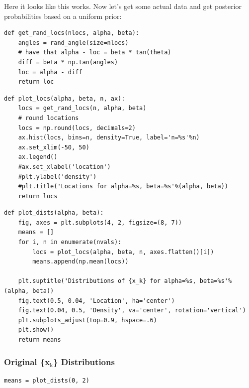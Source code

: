 \documentclass[11pt]{article}
\begin{document}
Here it looks like this works. Now let's get some actual data and get posterior
probabilities based on a uniform prior:

\begin{verbatim}
def get_rand_locs(nlocs, alpha, beta):
    angles = rand_angle(size=nlocs)
    # have that alpha - loc = beta * tan(theta)
    diff = beta * np.tan(angles)
    loc = alpha - diff
    return loc
\end{verbatim}


\begin{verbatim}
def plot_locs(alpha, beta, n, ax):
    locs = get_rand_locs(n, alpha, beta)
    # round locations
    locs = np.round(locs, decimals=2)
    ax.hist(locs, bins=n, density=True, label='n=%s'%n)
    ax.set_xlim(-50, 50)
    ax.legend()
    #ax.set_xlabel('location')
    #plt.ylabel('density')
    #plt.title('Locations for alpha=%s, beta=%s'%(alpha, beta))
    return locs
\end{verbatim}


\begin{verbatim}
def plot_dists(alpha, beta):
    fig, axes = plt.subplots(4, 2, figsize=(8, 7))
    means = []
    for i, n in enumerate(nvals):
        locs = plot_locs(alpha, beta, n, axes.flatten()[i])
        means.append(np.mean(locs))

    plt.suptitle('Distributions of {x_k} for alpha=%s, beta=%s'%(alpha, beta))
    fig.text(0.5, 0.04, 'Location', ha='center')
    fig.text(0.04, 0.5, 'Density', va='center', rotation='vertical')
    plt.subplots_adjust(top=0.9, hspace=.6)
    plt.show()
    return means
\end{verbatim}

\subsubsection*{Original \{x$_{\text{k}}$\} Distributions}
\label{sec-2-2-1}

\begin{verbatim}
means = plot_dists(0, 2)
\end{verbatim}
\end{document}
